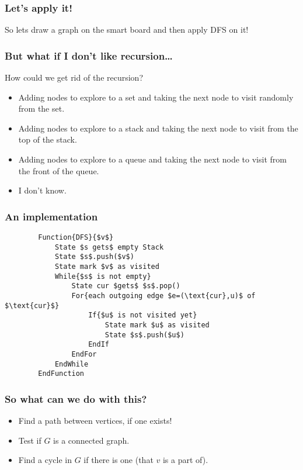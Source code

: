 \begin{frame}
	\frametitle{Let's apply it!}

		So lets draw a graph on the smart board and then apply DFS on it!
\end{frame}

\begin{frame}
	\frametitle{But what if I don't like recursion\dots}

		How could we get rid of the recursion?
		\begin{itemize}
			\item Adding nodes to explore to a set and taking the next node to visit randomly from the set.
			\item Adding nodes to explore to a stack and taking the next node to visit from the top of the stack.
			\item Adding nodes to explore to a queue and taking the next node to visit from the front of the queue.
			\item I don't know.
		\end{itemize}
\end{frame}

\begin{frame}[fragile]
	\frametitle{An implementation}
	
	\begin{lstlisting}
		Function{DFS}{$v$}
			State $s gets$ empty Stack
			State $s$.push($v$)
			State mark $v$ as visited
			While{$s$ is not empty}
				State cur $gets$ $s$.pop()
				For{each outgoing edge $e=(\text{cur},u)$ of $\text{cur}$}
					If{$u$ is not visited yet}
						State mark $u$ as visited
						State $s$.push($u$)
					EndIf
				EndFor
			EndWhile
		EndFunction
	\end{lstlisting}
\end{frame}

\begin{frame}
	\frametitle{So what can we do with this?}

			\begin{itemize}
				\item Find a path between vertices, if one exists! %
					
				\item Test if $G$ is a connected graph.
					
				\item Find a cycle in $G$ if there is one (that $v$ is a part of).
			\end{itemize}
			
\end{frame}

